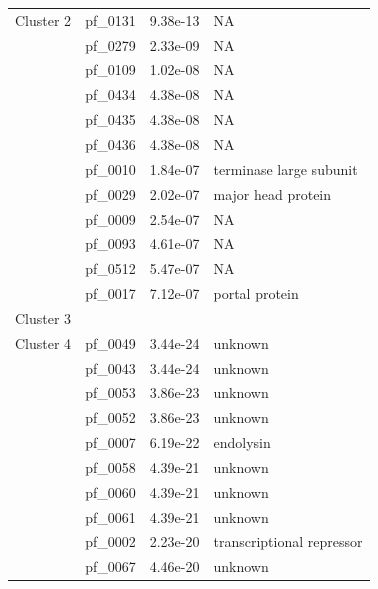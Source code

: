 \begin{table}
\begin{lrbox}{\leftbox}
\begin{tabular}[t]{llll}
            \midrule
            \multirow{1}{*}{Cluster 2} & pf\_0131 & 9.38e-13 & NA \\ 
                                        & pf\_0279 & 2.33e-09 & NA \\ 
                                        & pf\_0109 & 1.02e-08 & NA \\ 
                                        & pf\_0434 & 4.38e-08 & NA \\ 
                                        & pf\_0435 & 4.38e-08 & NA \\ 
                                        & pf\_0436 & 4.38e-08 & NA \\ 
                                        & pf\_0010 & 1.84e-07 & terminase large subunit \\ 
                                        & pf\_0029 & 2.02e-07 & major head protein \\ 
                                        & pf\_0009 & 2.54e-07 & NA \\ 
                                        & pf\_0093 & 4.61e-07 & NA \\ 
                                        & pf\_0512 & 5.47e-07 & NA \\ 
                                        & pf\_0017 & 7.12e-07 & portal protein \\ 
            \midrule
            Cluster 3 & & & \\
            \midrule
            \multirow{1}{*}{Cluster 4} & pf\_0049 & 3.44e-24 & unknown \\ 
                                        & pf\_0043 & 3.44e-24 & unknown \\ 
                                        & pf\_0053 & 3.86e-23 & unknown \\ 
                                        & pf\_0052 & 3.86e-23 & unknown \\ 
                                        & pf\_0007 & 6.19e-22 & endolysin \\ 
                                        & pf\_0058 & 4.39e-21 & unknown \\ 
                                        & pf\_0060 & 4.39e-21 & unknown \\ 
                                        & pf\_0061 & 4.39e-21 & unknown \\ 
                                        & pf\_0002 & 2.23e-20 & transcriptional repressor \\ 
                                        & pf\_0067 & 4.46e-20 & unknown \\ 

\end{tabular}
\end{lrbox}
\end{table}
